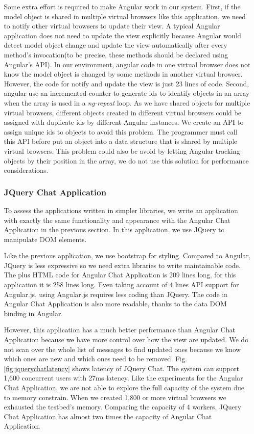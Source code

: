 Some extra effort is required to make Angular work in our system.
First, if the model object is shared in multiple virtual browsers like this application,
we need to notify other virtual browsers to update their view.
A typical Angular application does not need to update the view explicitly because
Angular would detect model object change and update the view automatically 
after every method's invocation(to be precise, these methods should be declared using Angular's API).
In our environment, angular code in one virtual browser does not know the model object
is changed by some methods in another virtual browser.
However, the code for notify and update the view is just 23 lines of code.
Second, angular use an incremented counter to generate ids to identify objects in an array when the 
array is used in a \emph{ng-repeat} loop.
As we have shared objects for multiple virtual browsers,
different objects created in different virtual browsers could be assigned with duplicate 
ids by different Angular instances.
We create an API to assign unique ids to objects to avoid this problem.
The programmer must call this API before put an object into a data structure that is shared
by multiple virtual browsers.
This problem could also be avoid by letting Angular tracking objects by their position in the array,
we do not use this solution for performance considerations.


\angularchatlatency{}

\subsubsection{JQuery Chat Application}
\label{sec:jquery}
To assess the applications written in simpler \js{} libraries,
we write an application with exactly the same functionality and 
appearance with the Angular Chat Application in the previous section.
In this application, we use JQuery to manipulate DOM elements.

Like the previous application, we use bootstrap for styling.
Compared to Angular, JQuery is less expressive so we need
extra libraries to write maintainable code.
The \js{} plus HTML code for Angular Chat Application is 209 lines long,
for this application it is 258 lines long.
Even taking account of 4 lines API support for Angular.js, 
using Angular.js requires less coding than JQuery.
The code in Angular Chat Application is also more readable,
thanks to the data DOM binding in Angular.

However, this application has a much better performance than Angular 
Chat Application because we have more control over how the view
are updated.
We do not scan over the whole list of messages to find updated ones
because we know which ones are new and which ones need to be removed.
Fig.\ref{fig:jquerychatlatency} shows latency of JQuery Chat.
The system can support 1,600 concurrent users with 27ms latency.
Like the experiments for the Angular Chat Application,
we are not able to explore the full capacity of the system due to 
memory constrain.
When we created 1,800 or more virtual browsers we exhausted the testbed's memory.
Comparing the capacity of 4 workers, 
JQuery Chat Application has almost two times the capacity of Angular Chat Application.


